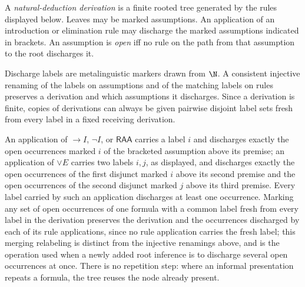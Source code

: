 \begin{definition}
A \emph{natural-deduction derivation} is a finite rooted tree generated by the
rules displayed below.  Leaves may be marked assumptions.  An application of
an introduction or elimination rule may discharge the marked assumptions
indicated in brackets.  An assumption is \emph{open} iff no rule on the path
from that assumption to the root discharges it.

Discharge labels are metalinguistic markers drawn from \(\N\).  A consistent
injective renaming of the labels on assumptions and of the matching labels on
rules preserves a derivation and which assumptions it discharges.  Since a
derivation is finite, copies of derivations can always be given pairwise
disjoint label sets fresh from every label in a fixed receiving derivation.

An application of \(\to I\), \(\neg I\), or \(\mathsf{RAA}\) carries a
label \(i\) and discharges exactly the open occurrences marked \(i\) of
the bracketed assumption above its premise; an application of \(\lor E\)
carries two labels \(i,j\), as displayed, and discharges exactly the open
occurrences of the first disjunct marked \(i\) above its second premise
and the open occurrences of the second disjunct marked \(j\) above its
third premise.  Every label carried by such an application discharges at
least one occurrence.  Marking any set of open occurrences of one formula
with a common label fresh from every label in the derivation preserves
the derivation and the occurrences discharged by each of its rule
applications, since no rule application carries the fresh label; this
merging relabeling is distinct from the injective renamings above, and is
the operation used when a newly added root inference is to discharge
several open occurrences at once.  There is no repetition step: where an
informal presentation repeats a formula, the tree reuses the node already
present.
\end{definition}

